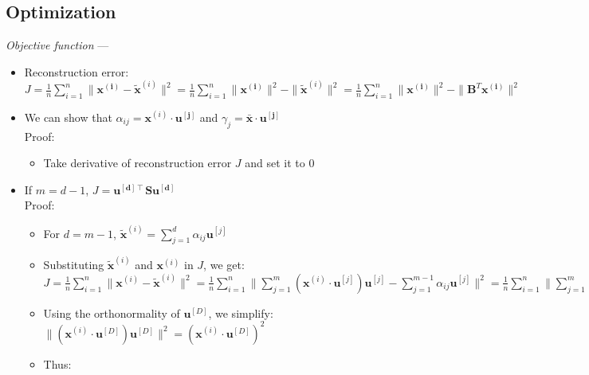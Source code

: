 \subsection*{Optimization}
\emph{Objective function} ---
\begin{itemize}
    \item Reconstruction error: $J = \frac{1}{n} \sum_{i=1}^n \| \boldsymbol{x^{(i)}} - \tilde{\boldsymbol{x}}^{(i)} \|^2 = \frac{1}{n} \sum_{i=1}^n \| \boldsymbol{x^{(i)}}\|^2 - \| \tilde{\boldsymbol{x}}^{(i)} \|^2 = \frac{1}{n} \sum_{i=1}^n \| \boldsymbol{x^{(i)}} \|^2 - \| \boldsymbol{B}^T \boldsymbol{x^{(i)}} \|^2$    
    \item We can show that $\alpha_{ij} = \boldsymbol{x}^{(i)} \cdot \boldsymbol{u^{[j]}}$ and $\gamma_j = \bar{\boldsymbol{x}} \cdot \boldsymbol{u^{[j]}}$\\
    Proof:
    \begin{itemize}
        \item Take derivative of reconstruction error $J$ and set it to $0$
    \end{itemize}
    \item If $m = d-1$, $J = \boldsymbol{u^{[d]\intercal}} \boldsymbol{S}\boldsymbol{u^{[d]}}$\\
    Proof:
    \begin{itemize}
        \item For $ d = m - 1 $,  
        $
        \tilde{\boldsymbol{x}}^{(i)} = \sum_{j=1}^d \alpha_{ij} \boldsymbol{u}^{[j]}
        $
        \item Substituting $\tilde{\boldsymbol{x}}^{(i)}$ and $\boldsymbol{x}^{(i)}$ in $ J $, we get:
        $
        J = \frac{1}{n} \sum_{i=1}^n \| \boldsymbol{x}^{(i)} - \tilde{\boldsymbol{x}}^{(i)} \|^2 = \frac{1}{n} \sum_{i=1}^n \| \sum_{j=1}^m (\boldsymbol{x}^{(i)} \cdot \boldsymbol{u}^{[j]}) \boldsymbol{u}^{[j]} - \sum_{j=1}^{m-1} \alpha_{ij} \boldsymbol{u}^{[j]} \|^2 = \frac{1}{n} \sum_{i=1}^n \| \sum_{j=1}^m (\boldsymbol{x}^{(i)} \cdot \boldsymbol{u}^{[j]}) \boldsymbol{u}^{[j]} - \sum_{j=1}^{m-1} (\boldsymbol{x}^{(i)} \cdot \boldsymbol{u}^{[j]}) \boldsymbol{u}^{[j]} \|^2 = \frac{1}{n} \sum_{i=1}^n \| (\boldsymbol{x}^{(i)} \cdot \boldsymbol{u}^{[D]}) \boldsymbol{u}^{[D]} \|^2
        $
        \item Using the orthonormality of $ \boldsymbol{u}^{[D]} $, we simplify:
        $
        \| (\boldsymbol{x}^{(i)} \cdot \boldsymbol{u}^{[D]}) \boldsymbol{u}^{[D]} \|^2 = (\boldsymbol{x}^{(i)} \cdot \boldsymbol{u}^{[D]})^2
        $
        \item Thus:

\end{itemize}
\end{itemize}
